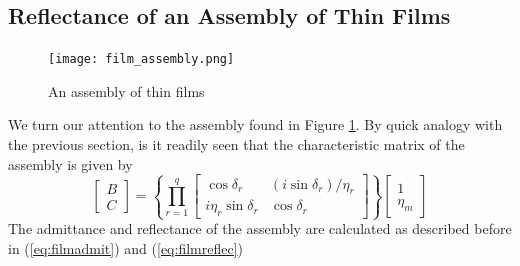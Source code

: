 \documentclass{article}
\begin{document}
\subsection{Reflectance of an Assembly of Thin Films}
    \begin{figure}
        \texttt{[image: film\_assembly.png]}
        \caption{An assembly of thin films}
        \label{fig:assem}
    \end{figure}
    We turn our attention to the assembly found in Figure \ref{fig:assem}. By quick analogy with the previous section, is it readily seen that the characteristic matrix of the assembly is given by
    \begin{equation}
        \begin{bmatrix}
            B \\
            C
        \end{bmatrix}
        =
        \left\{\prod_{r=1}^q
        \begin{bmatrix}
            \cos \delta_r & (i \sin \delta_r)/\eta_r \\
            i \eta_r \sin \delta_r & \cos \delta_r            
        \end{bmatrix}
        \right\}
        \begin{bmatrix}
            1 \\
            \eta_m            
        \end{bmatrix}
    \end{equation}
    The admittance and reflectance of the assembly are calculated as described before in (\ref{eq:filmadmit}) and (\ref{eq:filmreflec})
\end{document}
